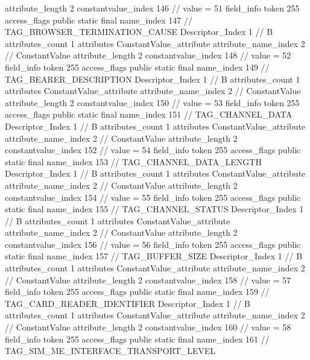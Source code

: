 {{{{{{{					attribute_length	2
					constantvalue_index	146		// value = 51
				}
				}
			}
			field_info {
				token	255
				access_flags	public static final
				name_index	147		// TAG_BROWSER_TERMINATION_CAUSE
				Descriptor_Index	1		// B
				attributes_count	1
				attributes {
				ConstantValue_attribute {
					attribute_name_index	2		// ConstantValue
					attribute_length	2
					constantvalue_index	148		// value = 52
				}
				}
			}
			field_info {
				token	255
				access_flags	public static final
				name_index	149		// TAG_BEARER_DESCRIPTION
				Descriptor_Index	1		// B
				attributes_count	1
				attributes {
				ConstantValue_attribute {
					attribute_name_index	2		// ConstantValue
					attribute_length	2
					constantvalue_index	150		// value = 53
				}
				}
			}
			field_info {
				token	255
				access_flags	public static final
				name_index	151		// TAG_CHANNEL_DATA
				Descriptor_Index	1		// B
				attributes_count	1
				attributes {
				ConstantValue_attribute {
					attribute_name_index	2		// ConstantValue
					attribute_length	2
					constantvalue_index	152		// value = 54
				}
				}
			}
			field_info {
				token	255
				access_flags	public static final
				name_index	153		// TAG_CHANNEL_DATA_LENGTH
				Descriptor_Index	1		// B
				attributes_count	1
				attributes {
				ConstantValue_attribute {
					attribute_name_index	2		// ConstantValue
					attribute_length	2
					constantvalue_index	154		// value = 55
				}
				}
			}
			field_info {
				token	255
				access_flags	public static final
				name_index	155		// TAG_CHANNEL_STATUS
				Descriptor_Index	1		// B
				attributes_count	1
				attributes {
				ConstantValue_attribute {
					attribute_name_index	2		// ConstantValue
					attribute_length	2
					constantvalue_index	156		// value = 56
				}
				}
			}
			field_info {
				token	255
				access_flags	public static final
				name_index	157		// TAG_BUFFER_SIZE
				Descriptor_Index	1		// B
				attributes_count	1
				attributes {
				ConstantValue_attribute {
					attribute_name_index	2		// ConstantValue
					attribute_length	2
					constantvalue_index	158		// value = 57
				}
				}
			}
			field_info {
				token	255
				access_flags	public static final
				name_index	159		// TAG_CARD_READER_IDENTIFIER
				Descriptor_Index	1		// B
				attributes_count	1
				attributes {
				ConstantValue_attribute {
					attribute_name_index	2		// ConstantValue
					attribute_length	2
					constantvalue_index	160		// value = 58
				}
				}
			}
			field_info {
				token	255
				access_flags	public static final
				name_index	161		// TAG_SIM_ME_INTERFACE_TRANSPORT_LEVEL
}}}}}

